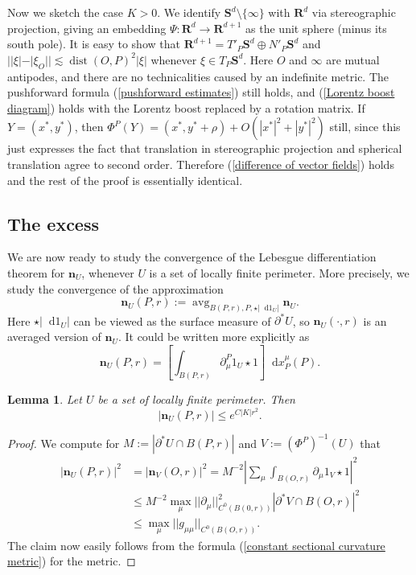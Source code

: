 \documentclass[reqno,11pt]{amsart}
\newcommand{\RR}{\mathbf{R}}
\newcommand{\Sph}{\mathbf S}
\DeclareMathOperator{\avg}{avg}
\newcommand*\dif{\mathop{}\!\mathrm{d}}
\DeclareMathOperator{\dist}{dist}
\newcommand{\normal}{\mathbf n}
\newtheorem{lemma}[theorem]{Lemma}
\theoremstyle{definition}
\numberwithin{equation}{section}
\begin{document}
Now we sketch the case $K > 0$.
We identify $\Sph^d \setminus \{\infty\}$ with $\RR^d$ via stereographic projection, giving an embedding $\Psi: \RR^d \to \RR^{d + 1}$ as the unit sphere (minus its south pole).
It is easy to show that $\RR^{d + 1} = T'_P \Sph^d \oplus N'_P \Sph^d$ and $||\xi| - |\xi_O|| \lesssim \dist(O, P)^2 |\xi|$ whenever $\xi \in T_P \Sph^d$.
Here $O$ and $\infty$ are mutual antipodes, and there are no technicalities caused by an indefinite metric.
The pushforward formula (\ref{pushforward estimates}) still holds, and (\ref{Lorentz boost diagram}) holds with the Lorentz boost replaced by a rotation matrix.
If $Y = (x^*, y^*)$, then $\Phi^P(Y) = (x^*, y^* + \rho) + O(|x^*|^2 + |y^*|^2)$ still, since this just expresses the fact that translation in stereographic projection and spherical translation agree to second order.
Therefore (\ref{difference of vector fields}) holds and the rest of the proof is essentially identical.


\subsection{The excess}
We are now ready to study the convergence of the Lebesgue differentiation theorem for $\normal_U$, whenever $U$ is a set of locally finite perimeter.
More precisely, we study the convergence of the approximation
$$\normal_U(P, r) := \avg_{B(P, r), P, \star |\dif 1_U|} \normal_U.$$
Here $\star |\dif 1_U|$ can be viewed as the surface measure of $\partial^* U$, so $\normal_U(\cdot, r)$ is an averaged version of $\normal_U$.
It could be written more explicitly as
$$\normal_U(P, r) = \left[\int_{B(P, r)} \partial_\mu^P 1_U \star 1\right] \dif x_P^\mu(P).$$

\begin{lemma}\label{gauge invariance of the normal}
Let $U$ be a set of locally finite perimeter. Then
$$|\normal_U(P, r)| \leq e^{C|K|r^2}.$$
\end{lemma}
\begin{proof}
We compute for $M := |\partial^* U \cap B(P, r)|$ and $V := (\Phi^P)^{-1}(U)$ that
\begin{align*}
|\normal_U(P, r)|^2 &= |\normal_V(O, r)|^2 = M^{-2} \left|\sum_\mu \int_{B(O, r)} \partial_\mu 1_V \star 1\right|^2 \\
&\leq M^{-2} \max_\mu ||\partial_\mu||_{C^0(B(0, r))}^2 |\partial^* V \cap B(O, r)|^2 \\
&\leq \max_\mu ||g_{\mu\mu}||_{C^0(B(O, r))}.
\end{align*}
The claim now easily follows from the formula (\ref{constant sectional curvature metric}) for the metric.
\end{proof}
\end{document}
